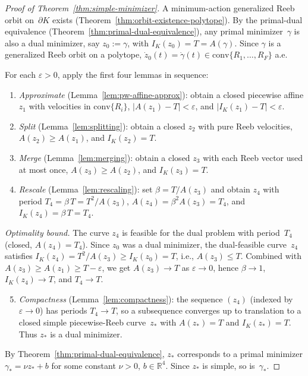 \begin{proof}[Proof of Theorem~\ref{thm:simple-minimizer}]
A minimum-action generalized Reeb orbit on~$\partial K$ exists
(Theorem~\ref{thm:orbit-existence-polytope}).
By the primal-dual equivalence
(Theorem~\ref{thm:primal-dual-equivalence}),
any primal minimizer~$\gamma$ is also a dual minimizer,
say $z_0 := \gamma$, with
$I_K(z_0) = T = A(\gamma)$.
Since $\gamma$ is a generalized Reeb orbit on a polytope,
$\dot{z}_0(t) = \dot{\gamma}(t)
  \in \mathrm{conv}\{R_1, \ldots, R_F\}$ a.e.

For each $\varepsilon > 0$, apply the first four lemmas in sequence:
\begin{enumerate}
\item \emph{Approximate}
  (Lemma~\ref{lem:pw-affine-approx}):
  obtain a closed piecewise affine $z_1$
  with velocities in $\mathrm{conv}\{R_i\}$,
  $|A(z_1) - T| < \varepsilon$, and
  $|I_K(z_1) - T| < \varepsilon$.

\item \emph{Split}
  (Lemma~\ref{lem:splitting}):
  obtain a closed $z_2$ with pure Reeb velocities,
  $A(z_2) \geq A(z_1)$, and $I_K(z_2) = T$.

\item \emph{Merge}
  (Lemma~\ref{lem:merging}):
  obtain a closed $z_3$ with each Reeb vector
  used at most once,
  $A(z_3) \geq A(z_2)$, and $I_K(z_3) = T$.

\item \emph{Rescale}
  (Lemma~\ref{lem:rescaling}):
  set $\beta = T / A(z_3)$ and obtain $z_4$ with
  period $T_4 = \beta\, T = T^2 / A(z_3)$,
  $A(z_4) = \beta^2 A(z_3) = T_4$, and
  $I_K(z_4) = \beta\, T = T_4$.
\end{enumerate}

\emph{Optimality bound.}
The curve $z_4$ is feasible for the dual problem
with period~$T_4$
(closed, $A(z_4) = T_4$).
Since $z_0$ was a dual minimizer, the dual-feasible
curve~$z_4$ satisfies
$I_K(z_4) = T^2 / A(z_3) \geq I_K(z_0) = T$,
i.e., $A(z_3) \leq T$.
Combined with $A(z_3) \geq A(z_1) \geq T - \varepsilon$,
we get $A(z_3) \to T$ as $\varepsilon \to 0$,
hence $\beta \to 1$, $I_K(z_4) \to T$, and $T_4 \to T$.

\begin{enumerate}\setcounter{enumi}{4}
\item \emph{Compactness}
  (Lemma~\ref{lem:compactness}):
  the sequence $(z_4)$ (indexed by $\varepsilon \to 0$)
  has periods $T_4 \to T$, so a subsequence converges up to translation
  to a closed simple piecewise-Reeb
  curve~$z_*$ with
  $A(z_*) = T$ and $I_K(z_*) = T$.
  Thus $z_*$ is a dual minimizer.
\end{enumerate}

By Theorem~\ref{thm:primal-dual-equivalence},
$z_*$ corresponds to a primal minimizer
$\gamma_* = \nu z_* + b$ for some constant
$\nu > 0$, $b \in \mathbb{R}^4$.
Since $z_*$ is simple, so is~$\gamma_*$.
\end{proof}

